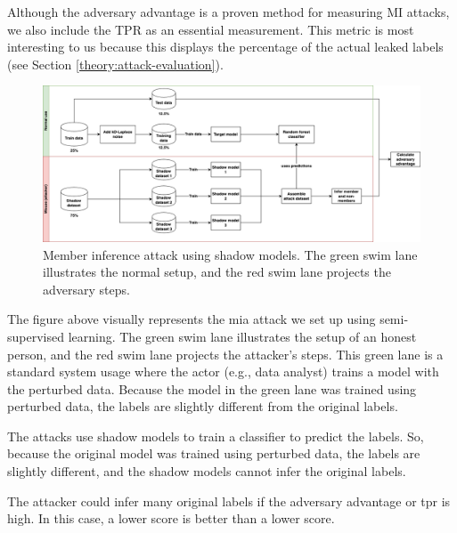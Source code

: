 \begin{enumerate}
            Although the adversary advantage is a proven method for measuring MI attacks, we also include the TPR as an essential measurement.
            This metric is most interesting to us because this displays the percentage of the actual leaked labels (see Section \ref{theory:attack-evaluation}).
            \begin{figure}[H]
                  \includegraphics[width=1.1\textwidth]{Method/images/MI-setup.png}
                  \caption{Member inference attack using shadow models. The green swim lane illustrates the normal setup, and the red swim lane projects the adversary steps.}
                  \label{figure:mi-attack}
            \end{figure}
            The figure above visually represents the \gls{mia} attack we set up using semi-supervised learning.
            The green swim lane illustrates the setup of an honest person, and the red swim lane projects the attacker's steps.
            This green lane is a standard system usage where the actor (e.g., data analyst) trains a model with the perturbed data.
            Because the model in the green lane was trained using perturbed data, the labels are slightly different from the original labels.

            The attacks use shadow models to train a classifier to predict the labels.
            So, because the original model was trained using perturbed data, the labels are slightly different, and the shadow models cannot infer the original labels. \newline

            The attacker could infer many original labels if the adversary advantage or \gls{tpr} is high.
            In this case, a lower score is better than a lower score.
\end{enumerate}
%
